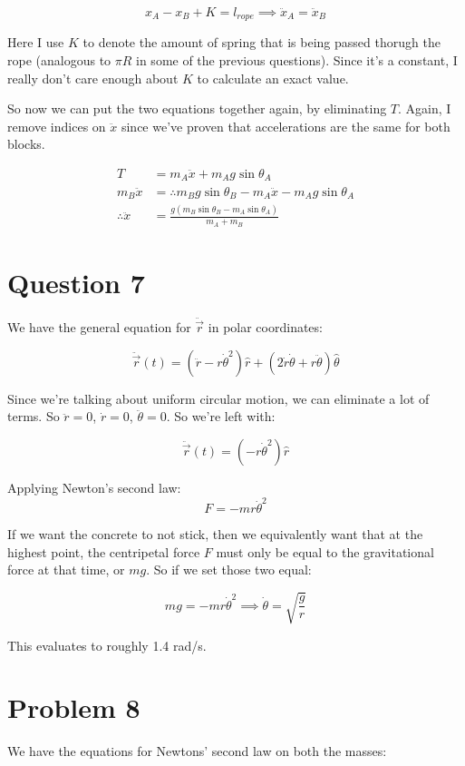 \documentclass{article}
\theoremstyle{definition}
\numberwithin{equation}{section}
\numberwithin{definition}{section}
\begin{document}
	\[ x_A - x_B + K = l_{rope} \implies \ddot x_A = \ddot x_B\]
	
	Here I use $K$ to denote the amount of spring that is being passed thorugh the rope (analogous to $\pi R$ in some of the previous questions). Since it's a constant, I really don't care enough about $K$ to calculate an exact value.
	
	So now we can put the two equations together again, by eliminating $T$. Again, I remove indices on $\ddot x$ since we've proven that accelerations are the same for both blocks.
	
	\begin{align*}
		T &= m_A\ddot x + m_Ag\sin \theta_A\\
	 m_B\ddot x &=	\therefore m_Bg\sin\theta_B - m_A\ddot x - m_Ag\sin\theta_A\\
	 \therefore \ddot x &=  \boxed{\frac{g(m_B\sin\theta_B - m_A\sin\theta_A)}{m_A + m_B} }
	\end{align*}
	
	\section{Question 7}
	
	We have the general equation for $\ddot{\vec r}$ in polar coordinates: 
	
	\[ \ddot{\vec r}(t) = (\ddot r - r \dot \theta^2)\hat r + (2\dot r \dot \theta + r \ddot \theta) \hat\theta\]
	
	Since we're talking about uniform circular motion, we can eliminate a lot of terms. So $\ddot r = 0$, $\dot r = 0$, $\ddot \theta = 0$. So we're left with: 
	
	\[ \ddot{\vec r}(t) = (-r\dot \theta^2) \hat r\]
	
	Applying Newton's second law: 
	\[ F = -mr\dot \theta^2\]
	
	If we want the concrete to not stick, then we equivalently want that at the highest point, the centripetal force $F$ must only be equal to the gravitational force at that time, or $mg$. So if we set those two equal: 
	
	\[ mg = -mr \dot \theta^2 \implies \dot \theta = \sqrt{\frac{g}{r}}\]
	
	This evaluates to roughly 1.4 rad/s.
	
	
	\section{Problem 8}
	We have the equations for Newtons' second law on both the masses:
	
\end{document}
